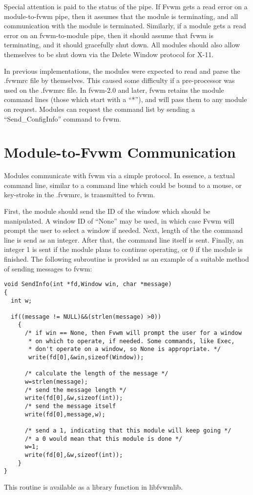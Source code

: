 Special attention is paid to the status of the pipe. If Fvwm gets a
read error on a module-to-fvwm  pipe, then it assumes that the module 
is terminating,
and all communication with the module is terminated. Similarly, if a
module gets a read error on an fvwm-to-module pipe, then it should
assume that fvwm is terminating, and it should gracefully shut down.
All modules should also allow themselves to be shut down via the
Delete Window protocol for X-11.

In previous implementations, the modules were expected to read and
parse the .fvwmrc file by themselves. This caused some difficulty if a
pre-processor was used on the .fvwmrc file. In fvwm-2.0 and later,
fvwm retains the module command lines (those which start with a
``*''), and will pass them to any module on request. Modules can
request the command list by sending a ``Send\_ConfigInfo'' command to
fvwm.

\section{Module-to-Fvwm Communication}
Modules communicate with fvwm via a simple protocol. In essence, a
textual command line, similar to a command line which could be bound
to a mouse, or key-stroke in the .fvwmrc, is transmitted to fvwm.

First, the module should send the ID of the window which should be
manipulated. A window ID of ``None'' may be used, in which case Fvwm
will prompt the user to select  a window if needed. Next, length of
the the command line is send as an integer. After that, the command
line itself is sent. Finally, an integer 1 is sent if the module plans
to continue operating, or 0 if the module is finished. The following
subroutine is provided as an example of a suitable method of sending
messages to fvwm:
\begin{verbatim}
void SendInfo(int *fd,Window win, char *message)
{
  int w;

  if((message != NULL)&&(strlen(message) >0))
    {	
      /* if win == None, then Fvwm will prompt the user for a window
       * on which to operate, if needed. Some commands, like Exec,
       * don't operate on a window, so None is appropriate. */
       write(fd[0],&win,sizeof(Window));
      
      /* calculate the length of the message */
      w=strlen(message);
      /* send the message length */
      write(fd[0],&w,sizeof(int));
      /* send the message itself
      write(fd[0],message,w);

      /* send a 1, indicating that this module will keep going */
      /* a 0 would mean that this module is done */
      w=1;
      write(fd[0],&w,sizeof(int));
    }
}
\end{verbatim}
This routine is available as a library function in libfvwmlib.


